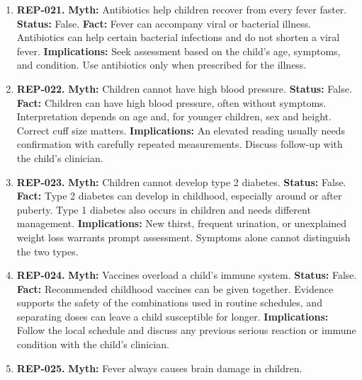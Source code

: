 \documentclass[11pt,oneside]{book}
\begin{document}
\begin{enumerate}[leftmargin=0pt,labelwidth=0pt,labelsep=0pt,itemindent=0pt]
\item[] \textbf{REP-021.} \textbf{Myth:} Antibiotics help children recover from every fever faster.\newline
\textbf{Status:} False.\newline
\textbf{Fact:} Fever can accompany viral or bacterial illness. Antibiotics can help certain bacterial infections and do not shorten a viral fever. \cite{ref294,ref295}\newline
\textbf{Implications:} Seek assessment based on the child's age, symptoms, and condition. Use antibiotics only when prescribed for the illness.
\item[] \textbf{REP-022.} \textbf{Myth:} Children cannot have high blood pressure.\newline
\textbf{Status:} False.\newline
\textbf{Fact:} Children can have high blood pressure, often without symptoms. Interpretation depends on age and, for younger children, sex and height. Correct cuff size matters. \cite{ref259}\newline
\textbf{Implications:} An elevated reading usually needs confirmation with carefully repeated measurements. Discuss follow-up with the child's clinician.
\item[] \textbf{REP-023.} \textbf{Myth:} Children cannot develop type 2 diabetes.\newline
\textbf{Status:} False.\newline
\textbf{Fact:} Type 2 diabetes can develop in childhood, especially around or after puberty. Type 1 diabetes also occurs in children and needs different management. \cite{ref260}\newline
\textbf{Implications:} New thirst, frequent urination, or unexplained weight loss warrants prompt assessment. Symptoms alone cannot distinguish the two types.
\item[] \textbf{REP-024.} \textbf{Myth:} Vaccines overload a child's immune system.\newline
\textbf{Status:} False.\newline
\textbf{Fact:} Recommended childhood vaccines can be given together. Evidence supports the safety of the combinations used in routine schedules, and separating doses can leave a child susceptible for longer. \cite{ref332}\newline
\textbf{Implications:} Follow the local schedule and discuss any previous serious reaction or immune condition with the child's clinician.
\item[] \textbf{REP-025.} \textbf{Myth:} Fever always causes brain damage in children.\newline

\end{enumerate}
\end{document}
